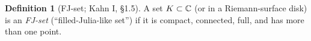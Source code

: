 \documentclass[11pt,reqno]{amsart}
\theoremstyle{definition}
\newtheorem{definition}[theorem]{Definition}
\theoremstyle{remark}
\begin{document}
\begin{definition}[FJ-set; Kahn I, \S1.5]\label{def:fjset}
A set \(K\subset\mathbb{C}\) (or in a Riemann-surface disk) is an \emph{FJ-set}
(``filled-Julia-like set'') if it is compact, connected, full, and has
more than one point.
\end{definition}
\end{document}
